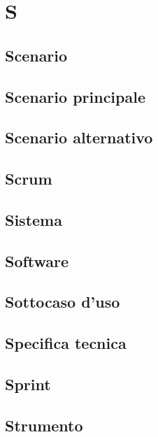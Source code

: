 \section{S} 
\subsection{Scenario} 

\subsection{Scenario principale} 

\subsection{Scenario alternativo} 

\subsection{Scrum} 

\subsection{Sistema} 

\subsection{Software} 

\subsection{Sottocaso d'uso} 

\subsection{Specifica tecnica} 

\subsection{Sprint} 

\subsection{Strumento} 


